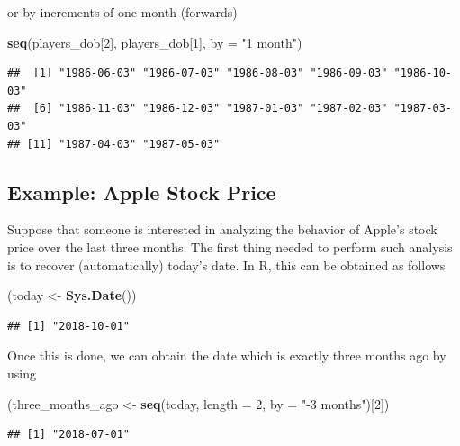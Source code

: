 \documentclass[12pt,]{krantz}
\newenvironment{Shaded}{\begin{snugshade}}{\end{snugshade}}
\newcommand{\KeywordTok}[1]{\textcolor[rgb]{0.27,0.27,0.27}{\textbf{#1}}}
\newcommand{\DataTypeTok}[1]{\textcolor[rgb]{0.27,0.27,0.27}{#1}}
\newcommand{\DecValTok}[1]{\textcolor[rgb]{0.06,0.06,0.06}{#1}}
\newcommand{\StringTok}[1]{\textcolor[rgb]{0.5,0.5,0.5}{#1}}
\newcommand{\NormalTok}[1]{#1}
\begin{document}
or by increments of one month (forwards)

\begin{Shaded}
\begin{Highlighting}[]
\KeywordTok{seq}\NormalTok{(players_dob[}\DecValTok{2}\NormalTok{], players_dob[}\DecValTok{1}\NormalTok{], }\DataTypeTok{by =} \StringTok{"1 month"}\NormalTok{)}
\end{Highlighting}
\end{Shaded}

\begin{verbatim}
##  [1] "1986-06-03" "1986-07-03" "1986-08-03" "1986-09-03" "1986-10-03"
##  [6] "1986-11-03" "1986-12-03" "1987-01-03" "1987-02-03" "1987-03-03"
## [11] "1987-04-03" "1987-05-03"
\end{verbatim}

\subsection{Example: Apple Stock Price}\label{example-apple-stock-price}

Suppose that someone is interested in analyzing the behavior of Apple's
stock price over the last three months. The first thing needed to
perform such analysis is to recover (automatically) today's date. In R,
this can be obtained as follows

\begin{Shaded}
\begin{Highlighting}[]
\NormalTok{(today <-}\StringTok{ }\KeywordTok{Sys.Date}\NormalTok{())}
\end{Highlighting}
\end{Shaded}

\begin{verbatim}
## [1] "2018-10-01"
\end{verbatim}

Once this is done, we can obtain the date which is exactly three months
ago by using

\begin{Shaded}
\begin{Highlighting}[]
\NormalTok{(three_months_ago <-}\StringTok{ }\KeywordTok{seq}\NormalTok{(today, }\DataTypeTok{length =} \DecValTok{2}\NormalTok{, }\DataTypeTok{by =} \StringTok{"-3 months"}\NormalTok{)[}\DecValTok{2}\NormalTok{])}
\end{Highlighting}
\end{Shaded}

\begin{verbatim}
## [1] "2018-07-01"
\end{verbatim}
\end{document}

